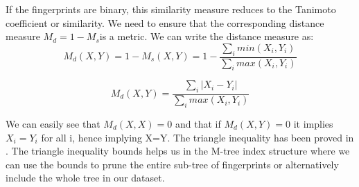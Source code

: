 If the fingerprints are binary, this similarity measure reduces to the Tanimoto coefficient or similarity. We need to ensure that the corresponding distance measure $M_d=1- M_s$is a metric. We can write the distance measure as:\\
\begin{equation}
 M_d(X,Y) = 1- M_s(X,Y) = 1- \frac{\sum \limits_{i} min(X_i, Y_i)}{\sum \limits_{i} max(X_i, Y_i)}
\end{equation} 

\begin{equation}
 M_d(X,Y)= \frac{\sum \limits_{i} |X_i - Y_i|}{\sum \limits_{i} max(X_i, Y_i)}
\end{equation} 

We can easily see that $M_d(X,X)=0$ and that if $M_d(X,Y)=0 $ it implies $X_i = Y_i$ for all i, hence implying X=Y. The triangle inequality has been proved in \citet*{lipkus1999proof}. The triangle inequality bounds helps us in the M-tree index structure where we can use the bounds to prune the entire sub-tree of fingerprints or alternatively include the whole tree in our dataset.\\

